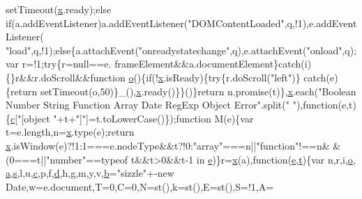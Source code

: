 \begin{DoxyCode}
      setTimeout(\hyperlink{jquery-1_810_82_8min_8js_a5ce50d751c9664d05375c8f5080ed43e}{x}.ready);\textcolor{keywordflow}{else} \textcolor{keywordflow}{if}(a.addEventListener)a.addEventListener(\textcolor{stringliteral}{"DOMContentLoaded"},q,!1),e.addEventListener(\textcolor{stringliteral}{
      "load"},q,!1);\textcolor{keywordflow}{else}\{a.attachEvent(\textcolor{stringliteral}{"onreadystatechange"},q),e.attachEvent(\textcolor{stringliteral}{"onload"},q);var r=!1;\textcolor{keywordflow}{try}\{r=null==e.
      frameElement&&a.documentElement\}\textcolor{keywordflow}{catch}(i)\{\}r&&r.doScroll&&\textcolor{keyword}{function} \hyperlink{jribbble_8js_a400dc8109620963da8314d4bdfa14f83}{o}()\{\textcolor{keywordflow}{if}(!\hyperlink{jquery-1_810_82_8min_8js_a5ce50d751c9664d05375c8f5080ed43e}{x}.isReady)\{\textcolor{keywordflow}{try}\{r.doScroll(\textcolor{stringliteral}{"left"})\}\textcolor{keywordflow}{
      catch}(e)\{\textcolor{keywordflow}{return} setTimeout(o,50)\}\_(),\hyperlink{jquery-1_810_82_8min_8js_a5ce50d751c9664d05375c8f5080ed43e}{x}.ready()\}\}()\}\textcolor{keywordflow}{return} n.promise(t)\},\hyperlink{jquery-1_810_82_8min_8js_a5ce50d751c9664d05375c8f5080ed43e}{x}.each(\textcolor{stringliteral}{"Boolean Number String
       Function Array Date RegExp Object Error"}.split(\textcolor{stringliteral}{" "}),\textcolor{keyword}{function}(e,t)\{\hyperlink{bootstrap_8min_8js_abce695e0af988ece0826d9ad59b8160d}{c}[\textcolor{stringliteral}{"[object "}+t+\textcolor{stringliteral}{"]"}]=t.toLowerCase()\});\textcolor{keyword}{function}
       M(e)\{var t=e.length,n=\hyperlink{jquery-1_810_82_8min_8js_a5ce50d751c9664d05375c8f5080ed43e}{x}.type(e);\textcolor{keywordflow}{return} \hyperlink{jquery-1_810_82_8min_8js_a5ce50d751c9664d05375c8f5080ed43e}{x}.isWindow(e)?!1:1===e.nodeType&&t?!0:\textcolor{stringliteral}{"array"}===n||\textcolor{stringliteral}{"function"}!==n&
      &(0===t||\textcolor{stringliteral}{"number"}==typeof t&&t>0&&t-1 in \hyperlink{jquery-1_810_82_8min_8js_a2c038346d47955cbe2cb91e338edd7e1}{e})\}r=\hyperlink{jquery-1_810_82_8min_8js_a5ce50d751c9664d05375c8f5080ed43e}{x}(a),\textcolor{keyword}{function}(\hyperlink{jquery-1_810_82_8min_8js_a2c038346d47955cbe2cb91e338edd7e1}{e},\hyperlink{jquery-1_810_82_8min_8js_a23c5666e83bbbceee94adcd0851f50c4}{t})\{var n,r,i,\hyperlink{jribbble_8js_a400dc8109620963da8314d4bdfa14f83}{o},
      \hyperlink{bootstrap_8min_8js_ae8f6b400ed3390908c5cdeebed3a82b9}{a},\hyperlink{jribbble_8js_ad9a7d92cb87932d25187fdec3ba1b621}{s},l,u,\hyperlink{bootstrap_8min_8js_abce695e0af988ece0826d9ad59b8160d}{c},p,f,\hyperlink{bootstrap_8min_8js_aeb337d295abaddb5ec3cb34cc2e2bbc9}{d},h,g,m,y,v,\hyperlink{bootstrap_8min_8js_ac0431efac4d7c393d1e70b86115cb93f}{b}=\textcolor{stringliteral}{"sizzle"}+-\textcolor{keyword}{new} Date,w=e.document,T=0,C=0,N=st(),k=st(),E=st(),S=!1,A=\textcolor{keyword}{
}
\end{DoxyCode}
